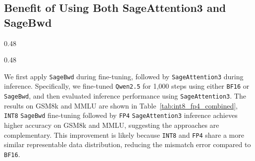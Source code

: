 \subsection{Benefit of Using Both SageAttention3 and SageBwd}
\vspace{-5mm}
\begin{table}[H]
\centering
\vspace{-.7em}
\caption{Comparison between \texttt{BF16} and \texttt{INT8} fine-tuning followed by \texttt{FP4} inference.}
\label{tab:int8_fp4_combined}
\begin{subtable}[t]{0.48\textwidth}
    \centering
    \label{tab:qwen15b_fp4}
\end{subtable}
\hfill
\begin{subtable}[t]{0.48\textwidth}
    \centering
    \label{tab:qwen3b_fp4}
\end{subtable}
\vspace{-0.7em}
\end{table}


We first apply \texttt{SageBwd} during fine-tuning, followed by \texttt{SageAttention3} during inference. Specifically, we fine-tuned \texttt{Qwen2.5} for 1,000 steps using either \texttt{BF16} or \texttt{SageBwd}, and then evaluated inference performance using \texttt{SageAttention3}. The results on GSM8k and MMLU are shown in Table~\ref{tab:int8_fp4_combined}, \texttt{INT8} \texttt{SageBwd} fine-tuning followed by \texttt{FP4} \texttt{SageAttention3} inference achieves higher accuracy on GSM8k and MMLU, suggesting the approaches are complementary. This improvement is likely because \texttt{INT8} and \texttt{FP4} share a more similar representable data distribution, reducing the mismatch error compared to \texttt{BF16}.


